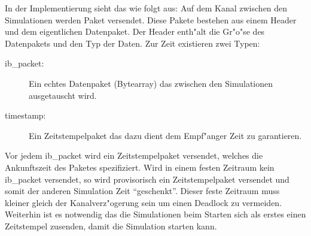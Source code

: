 In der Implementierung sieht das wie folgt aus: Auf dem Kanal zwischen den Simulationen
werden Paket versendet. Diese Pakete bestehen aus einem Header und dem eigentlichen
Datenpaket. Der Header enth"alt die Gr"o"se des Datenpakets und den Typ der Daten. Zur 
Zeit existieren zwei Typen: 
\begin{description}
\item[ib\_packet:] Ein echtes Datenpaket (Bytearray) das zwischen den Simulationen
ausgetauscht wird.
\item[timestamp:] Ein Zeitstempelpaket das dazu dient dem Empf"anger Zeit zu garantieren.
\end{description}
Vor jedem  ib\_packet wird ein Zeitstempelpaket versendet, welches die Ankunftszeit des
Paketes spezifiziert. Wird in einem festen Zeitraum kein ib\_packet versendet, so wird
provisorisch ein Zeitstempelpaket versendet und somit der anderen Simulation Zeit 
``geschenkt''. Dieser feste Zeitraum muss kleiner gleich der Kanalverz"ogerung sein um einen
Deadlock zu vermeiden. Weiterhin ist es notwendig das die Simulationen beim Starten sich als
erstes einen Zeitstempel zusenden, damit die Simulation starten kann.

 






